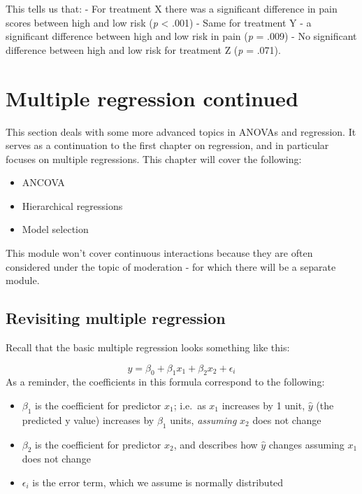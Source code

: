 \documentclass[
]{book}
\providecommand{\tightlist}{%
  \setlength{\itemsep}{0pt}\setlength{\parskip}{0pt}}
\begin{document}
This tells us that:
- For treatment X there was a significant difference in pain scores between high and low risk (\emph{p} \textless{} .001)
- Same for treatment Y - a significant difference between high and low risk in pain (\emph{p} = .009)
- No significant difference between high and low risk for treatment Z (\emph{p} = .071).

\chapter{Multiple regression continued}\label{multiple-regression-continued}

This section deals with some more advanced topics in ANOVAs and regression. It serves as a continuation to the first chapter on regression, and in particular focuses on multiple regressions. This chapter will cover the following:

\begin{itemize}
\tightlist
\item
  ANCOVA
\item
  Hierarchical regressions
\item
  Model selection
\end{itemize}

This module won't cover continuous interactions because they are often considered under the topic of moderation - for which there will be a separate module.

\section{Revisiting multiple regression}\label{revisiting-multiple-regression}

Recall that the basic multiple regression looks something like this:

\[
y = \beta_0 + \beta_1x_1 +\beta_2x_2 + \epsilon_i
\]
As a reminder, the coefficients in this formula correspond to the following:

\begin{itemize}
\tightlist
\item
  \(\beta_1\) is the coefficient for predictor \(x_1\); i.e.~as \(x_1\) increases by 1 unit, \(\hat y\) (the predicted y value) increases by \(\beta_1\) units, \emph{assuming} \(x_2\) does not change
\item
  \(\beta_2\) is the coefficient for predictor \(x_2\), and describes how \(\hat y\) changes assuming \(x_1\) does not change
\item
  \(\epsilon_i\) is the error term, which we assume is normally distributed
\end{itemize}
\end{document}

